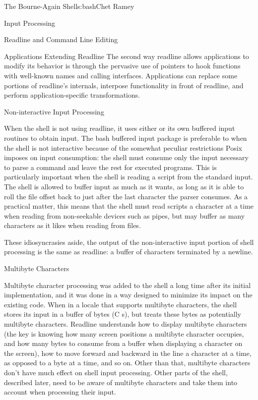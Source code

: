 \begin{aosachapter}{The Bourne-Again Shell}{s:bash}{Chet Ramey}
\begin{aosasect1}{Input Processing}
\begin{aosasect2}{Readline and Command Line Editing}
\begin{aosasect3}{Applications Extending Readline}
The second way readline allows applications to modify its behavior is
through the pervasive use of pointers to hook functions with
well-known names and calling interfaces.  Applications can replace
some portions of readline's internals, interpose functionality in
front of readline, and perform application-specific
transformations.

\end{aosasect3}

\end{aosasect2}

\begin{aosasect2}{Non-interactive Input Processing}

When the shell is not using readline, it uses either  or its own
buffered input routines to obtain input.  The bash buffered input
package is preferable to  when the shell is not interactive
because of the somewhat peculiar restrictions Posix imposes on input
consumption: the shell must consume only the input necessary to parse
a command and leave the rest for executed programs.  This is
particularly important when the shell is reading a script from the
standard input.  The shell is allowed to buffer input as much as it
wants, as long as it is able to roll the file offset back to just
after the last character the parser consumes.  As a practical matter,
this means that the shell must read scripts a character at a time when
reading from non-seekable devices such as pipes, but may buffer as
many characters as it likes when reading from files.

These idiosyncrasies aside, the output of the non-interactive input
portion of shell processing is the same as readline: a buffer of
characters terminated by a newline.

\end{aosasect2}

\begin{aosasect2}{Multibyte Characters}

Multibyte character processing was added to the shell a long time
after its initial implementation, and it was done in a way designed to
minimize its impact on the existing code.  When in a locale that
supports multibyte characters, the shell stores its input in a buffer
of bytes (C s), but treats these bytes as potentially
multibyte characters.  Readline understands how to display multibyte
characters (the key is knowing how many screen positions a multibyte
character occupies, and how many bytes to consume from a buffer when
displaying a character on the screen), how to move forward and
backward in the line a character at a time, as opposed to a byte at a
time, and so on.  Other than that, multibyte characters don't have
much effect on shell input processing.  Other parts of the shell,
described later, need to be aware of multibyte characters and take
them into account when processing their input.


\end{aosasect2}
\end{aosasect1}
\end{aosachapter}
